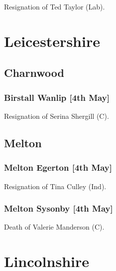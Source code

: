 \documentclass[a4paper,openany]{book}
\begin{document}
\begin{resultsiii}
Resignation of Ted Taylor (Lab).

\section{Leicestershire}

\subsection*{Charnwood}

\subsubsection*{Birstall Wanlip \hspace*{\fill}\nolinebreak[1]%
\enspace\hspace*{\fill}
[4th May]}


Resignation of Serina Shergill (C).

\subsection*{Melton}

\subsubsection*{Melton Egerton \hspace*{\fill}\nolinebreak[1]%
\enspace\hspace*{\fill}
[4th May]}


Resignation of Tina Culley (Ind).

\subsubsection*{Melton Sysonby \hspace*{\fill}\nolinebreak[1]%
\enspace\hspace*{\fill}
[4th May]}


Death of Valerie Manderson (C).

\section{Lincolnshire}


\end{resultsiii}
\end{document}
